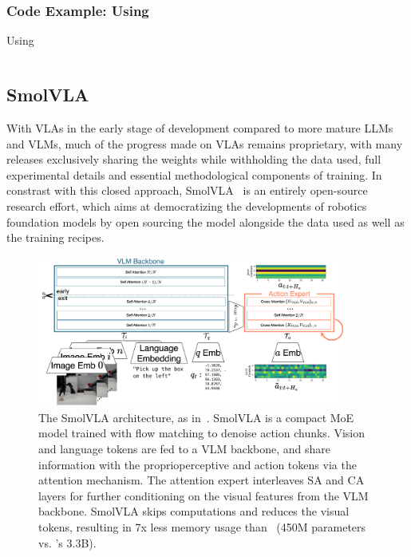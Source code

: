 \subsubsection{Code Example: Using \pizero}
\begin{pbox}[label={ex:using-pizero}]{Using \pizero}
    \inputminted{python}{snippets/ch5/01_using_pi0.py}
\end{pbox}

\subsection{SmolVLA}
With VLAs in the early stage of development compared to more mature LLMs and VLMs, much of the progress made on VLAs remains proprietary, with many releases exclusively sharing the weights while withholding the data used, full experimental details and essential methodological components of training.
In constrast with this closed approach, SmolVLA~\citep{shukorSmolVLAVisionLanguageActionModel2025} is an entirely open-source research effort, which aims at democratizing the developments of robotics foundation models by open sourcing the model alongside the data used as well as the training recipes.

\begin{figure}
    \centering
    \includegraphics[width=0.9\textwidth]{figures/ch5/ch5-smolvla.png}
    \caption{The SmolVLA architecture, as in~\citet{shukorSmolVLAVisionLanguageActionModel2025}. SmolVLA is a compact MoE model trained with flow matching to denoise action chunks. Vision and language tokens are fed to a VLM backbone, and share information with the proprioperceptive and action tokens via the attention mechanism. The attention expert interleaves SA and CA layers for further conditioning on the visual features from the VLM backbone. SmolVLA skips computations and reduces the visual tokens, resulting in 7x less memory usage than \pizero~(450M parameters vs. \pizero's 3.3B).}
    \label{fig:ch5-smolvla}
\end{figure}

